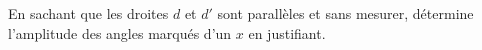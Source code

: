 %
%
En sachant que les droites $d$ et $d'$ sont parallèles et sans
    mesurer, détermine l'amplitude des angles marqués d'un $x$ en justifiant.
    \begin{tasks}
        \task {}
        \task {}
        \task {}
    \end{tasks}

